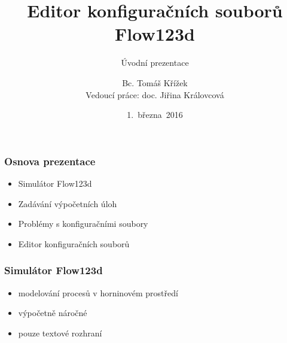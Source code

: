 \documentclass{beamer}
\begin{document}

\title[\textbf{Editor konfiguračních souborů Flow123d}]{Editor konfiguračních souborů Flow123d}
\subtitle{Úvodní prezentace}
\author[\textbf{Bc. Tomáš Křížek}]{{\large Bc. Tomáš Křížek}\\{\scriptsize Vedoucí práce: doc. Jiřina Královcová}}
\date{1.~března~2016}

\begin{frame}
	\titlepage
\end{frame}

\begin{frame}
	\frametitle{Osnova prezentace}
	\begin{itemize}
		\item Simulátor Flow123d
		\item Zadávání výpočetních úloh
		\item Problémy s konfiguračními soubory
		\item Editor konfiguračních souborů
	\end{itemize}
\end{frame}

\begin{frame}[t]
	\vspace{0.5cm}
	\frametitle{Simulátor Flow123d}
	\begin{itemize}[<+>]
		\item modelování procesů v horninovém prostředí
		\item výpočetně náročné
		\item pouze textové rozhraní
	\end{itemize}
	\vspace{0.4cm}
	\begin{figure}[h]
	\end{figure}
\end{frame}
\end{document}
